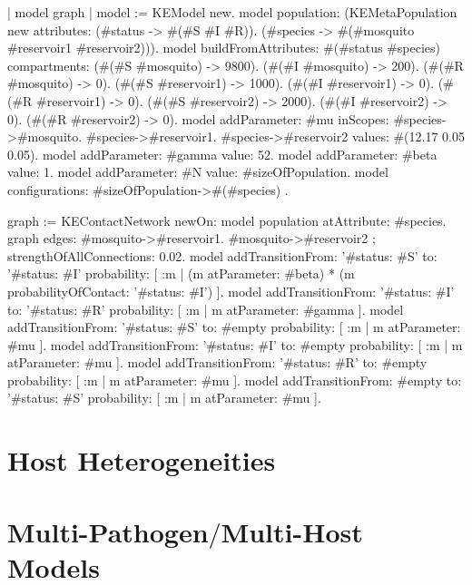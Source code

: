 \documentclass[a4paper,10pt,twoside]{book}
\begin{document}
\begin{code}{}
| model graph |
	model := KEModel new.
	model
		population:
			(KEMetaPopulation new
				attributes:
					{(#status -> #(#S #I #R)).
					(#species -> #(#mosquito #reservoir1 #reservoir2))}).
	model
		buildFromAttributes: #(#status #species)
		compartments:
			{(#(#S #mosquito) -> 9800).
			(#(#I #mosquito) -> 200).
			(#(#R #mosquito) -> 0).
			(#(#S #reservoir1) -> 1000).
			(#(#I #reservoir1) -> 0).
			(#(#R #reservoir1) -> 0).
			(#(#S #reservoir2) -> 2000).
			(#(#I #reservoir2) -> 0).
			(#(#R #reservoir2) -> 0)}.
	model addParameter: #mu
		   inScopes: {
				#species->#mosquito.
				#species->#reservoir1.
				#species->#reservoir2}
		   values: #(12.17 0.05 0.05).
	model addParameter: #gamma value: 52.
	model addParameter: #beta value: 1.
	model addParameter: #N value: #sizeOfPopulation.
	model configurations: { #sizeOfPopulation->#(#species) }.

	graph := KEContactNetwork
			newOn: model population
			atAttribute: #species.
	graph edges: { #mosquito->#reservoir1. #mosquito->#reservoir2 };
			strengthOfAllConnections: 0.02.
	model
		addTransitionFrom: '{#status: #S}'
		to: '{#status: #I}'
		probability: [ :m | (m atParameter: #beta) * (m probabilityOfContact: '{#status: #I}') ].
	model
		addTransitionFrom: '{#status: #I}'
		to: '{#status: #R}'
		probability: [ :m | m atParameter: #gamma ].
	model
		addTransitionFrom: '{#status: #S}'
		to: #empty
		probability: [ :m | m atParameter: #mu ].
	model
		addTransitionFrom: '{#status: #I}'
		to: #empty
		probability: [ :m | m atParameter: #mu ].
	model
		addTransitionFrom: '{#status: #R}'
		to: #empty
		probability: [ :m | m atParameter: #mu ].
	model
		addTransitionFrom: #empty
		to: '{#status: #S}'
		probability: [ :m | m atParameter: #mu ].
\end{code}

\chapter{ Host Heterogeneities}\chapter{ Multi-Pathogen$/$Multi-Host Models}




\printindex
\end{document}
